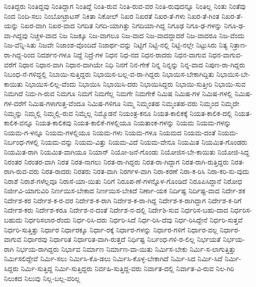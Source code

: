 {ನಿಂತಿದ್ದರು
ನಿಂತಿದ್ದವು
ನಿಂತಿದ್ದಾಗ
ನಿಂತಿದ್ದೆ
ನಿಂತಿ-ರುವ
ನಿಂತಿ-ರುವ-ವರ
ನಿಂತಿ-ರುವುದನ್ನೂ
ನಿಂತಿಲ್ಲ
ನಿಂತು
ನಿಂತೆವು
ನಿಂದ
ನಿಂದಿ-ಸಲು
ನಿಂಬೋಟ್ರಾಟಸ್
ನಿಕಿತಾ
ನಿಕೋಲ್
ನಿಖರ
ನಿಖರತೆ
ನಿಖರ-ತೆ-ಗಳು
ನಿಖರ-ತೆ-ಗಿಂತ
ನಿಖರ-ತೆ-ಯನ್ನು
ನಿಖರ-ವಾಗಿ
ನಿಖರ-ವಾದ
ನಿಗದಿತ
ನಿಗದಿ-ಯಾಗಿತ್ತು
ನಿಗದಿಯಾ-ಗಿದ್ದ
ನಿಗೂಢ
ನಿಗೂ-ಢ-ಗಳನ್ನು
ನಿಗೂ-ಢ-ವಾ-ಗಿದ್ದವು
ನಿಚ್ಚಳ-ವಾದ
ನಿಜ
ನಿಜಕ್ಕೂ
ನಿಜ-ವಾಗಲೂ
ನಿಜ-ವಾದ
ನಿಜ-ವಾದದ್ದಾದರೆ
ನಿಜ-ವಾದರೂ
ನಿಜ-ವೆಂದು
ನಿಜ-ವೆನ್ನಿ-ಸಿತು
ನಿಜವೇ
ನಿಜಾಂಶ-ವೊಂದಿದೆ
ನಿಜಾರ್ಥ-ವನ್ನು
ನಿಟ್ಟಿಗೆ
ನಿಟ್ಟಿ-ನಲ್ಲಿ
ನಿಟ್ಟಿ-ನಲ್ಲೇ
ನಿಟ್ಟುಸಿರು
ನಿತ್ಯ
ನಿತ್ರಾಣ-ರಾ-ಗಿದ್ದ-ರಿಂದ
ನಿದರ್ಶನ-ಗಳೂ
ನಿದ್ದೆ
ನಿದ್ರೆ-ಗಳ
ನಿಧನ
ನಿಧ-ನದ
ನಿಧನ-ರಾದರು
ನಿಧನ-ವಾಗುವ
ನಿಧನ-ವಾಗುವ-ವರೆಗೆ
ನಿಧಾನ
ನಿಧಾನ-ವಾಗಿ
ನಿಧಾನ-ವಾಗಿಯೇ
ನಿಧಿ
ನಿನಗೆ
ನಿನ-ಗೇಕೆ
ನಿನ್ನ
ನಿನ್ನನ್ನು
ನಿನ್ನ-ವಾದ
ನಿಪುಣ-ರಾ-ಗಿದ್ದರು
ನಿಬಂಧ-ನೆ-ಗಳಿದ್ದಲ್ಲಿ
ನಿಬಾಯಿ-ಸುತ್ತಿದ್ದರು
ನಿಭಾಯಿಸ-ಬಲ್ಲ-ವ-ರಾ-ಗಿದ್ದರು
ನಿಭಾಯಿಸ-ಬೇಕಾಗಿದ್ದಿತು
ನಿಭಾಯಿಸ-ಬೇ-ಕಾಯಿತು
ನಿಭಾಯಿಸ-ಲಿಲ್ಲ-ವೆಂದು
ನಿಭಾಯಿಸಿ
ನಿಭಾಯಿಸಿ-ದರು
ನಿಭಾಯಿಸಿದ್ದರು
ನಿಭಾಯಿ-ಸುತ್ತೀರಿ
ನಿಭಾಯಿ-ಸುವ
ನಿಮಗಿದೆ
ನಿಮ-ಗಿ-ರುವ
ನಿಮಗೂ
ನಿಮಗೆ
ನಿಮಗೆಲ್ಲ
ನಿಮಗೇ
ನಿಮಗೇಕೆ
ನಿಮಿಷ
ನಿಮಿಷ-ಗಳ
ನಿಮಿಷ-ಗಳಲ್ಲಿ
ನಿಮಿಷ-ಗಳ-ವರೆಗೆ
ನಿಮಿಷ-ಗಳಾಗುತ್ತ-ವೆಂದೂ
ನಿಮಿಷ-ಗಳಿಗೂ
ನಿಮ್ಮ
ನಿಮ್ಮಂತಹ
ನಿಮ್ಮಂತಹ-ವರು
ನಿಮ್ಮಂದ
ನಿಮ್ಮದೇ
ನಿಮ್ಮನ್ನು
ನಿಮ್ಮಲ್ಲಿ
ನಿಮ್ಮಲ್ಲಿ-ರುವ
ನಿಮ್ಮೆಲ್ಲ
ನಿಮ್ಮೊಡನೆ
ನಿಯಂತ್ರ-ಕನೂ
ನಿಯತ-ಕಾಲಿಕಕ್ಕೆ
ನಿಯತ-ಕಾಲಿಕ-ದಲ್ಲಿ
ನಿಯತ-ಕಾಲಿಕ-ವನ್ನೂ
ನಿಯತ-ಕಾಲಿಕವು
ನಿಯತ-ಕಾಲಿಕೆ-ಗಳಲ್ಲಿಯೂ
ನಿಯತಾಂಕ-ಗಳನ್ನು
ನಿಯಮ
ನಿಯಮ-ಗಳನ್ನು
ನಿಯಮ-ಗ-ಳನ್ನೂ
ನಿಯಮ-ಗಳಲ್ಲಿಯೂ
ನಿಯಮ-ಗಳು
ನಿಯಮ-ಗಳೂ
ನಿಯಮದ
ನಿಯಮ-ದಂತೆ
ನಿಯಮ-ನಿರ್ಬಂಧ-ಗಳಲ್ಲಿ
ನಿಯಮ-ವನ್ನು
ನಿಯಮ-ವಿತ್ತು
ನಿಯಮ-ವಿದೆ
ನಿಯಮ-ವೇನೂ
ನಿಯಮಿತ
ನಿಯಮಿತ-ಗೊಂಡರು
ನಿಯಮಿತ-ರಾಗಿ
ನಿಯಮಿತ-ವಾಗಿಯೂ
ನಿಯಾನ್
ನಿಯೋ-ಜನೆ-ಗೊಂಡು
ನಿಯೋಜಿಸ-ಬೇ-ಕಾಯಿತು
ನಿಯೋಜಿ-ಸಿದ್ದ
ನಿರಂತರ
ನಿರಂತರ-ವಾಗಿ
ನಿರತ
ನಿರತ-ನಾಗಲು
ನಿರತ-ರಾ-ಗಿದ್ದರು
ನಿರತ-ರಾ-ಗಿದ್ದಾಗ
ನಿರತ-ರಾಗಿ-ರುತ್ತಿದ್ದರು
ನಿರತ-ರಾಗಿ-ರುವ-ವರು
ನಿರತ-ರಾದರು
ನಿರತರು
ನಿರತ-ವಾಗಿ
ನಿರರ್ಗಳ-ವಾಗಿ
ನಿರಾ-ಕರಣೆ
ನಿರಾ-ಕ-ರಿಸಿ
ನಿರಾ-ಕರಿ-ಸು-ವುದು
ನಿರಾಶೆ
ನಿರಾಶೆ-ಗಳೆಲ್ಲವೂ
ನಿರಾಸೆ-ಯಾ-ಯಿತು
ನಿರಿಗೆ
ನಿರೂಪ-ಣೆ-ಗಳನ್ನೊಳ-ಗೊಂಡಿದೆ
ನಿರೂಪಿಸಿದ್ದಾನೆ
ನಿರೋಧ
ನಿರ್ಜೀವಿ-ಯಾಗುವಿರಿ
ನಿರ್ಣಯಿಸ-ಬೇಕಾದ
ನಿರ್ಣಯಿಸ-ಬೇಕಿದೆ
ನಿರ್ಣಾ-ಯಕ
ನಿರ್ದಿಷ್ಟ
ನಿರ್ದಿಷ್ಟ-ವಾದ
ನಿರ್ದೇ-ಶಕ
ನಿರ್ದೇಶ-ಕರ
ನಿರ್ದೇಶ-ಕ-ರ-ವರ
ನಿರ್ದೇಶ-ಕ-ರಾಗಿ
ನಿರ್ದೇಶ-ಕ-ರಾ-ಗಿದ್ದ
ನಿರ್ದೇಶ-ಕ-ರಾಗಿದ್ದಾಗ
ನಿರ್ದೇಶ-ಕ-ರಿಗೆ
ನಿರ್ದೇಶ-ಕರು
ನಿರ್ದೇಶ-ಕರೂ
ನಿರ್ದೇಶ-ನ-ದಂತೆ
ನಿರ್ದೇಶ-ನ-ದಲ್ಲಿ
ನಿರ್ದೇಶಿ-ಸುವ
ನಿರ್ಧರಿಸ-ಬಹು-ದಾದ
ನಿರ್ಧರಿಸ-ಬಹುದು
ನಿರ್ಧರಿಸಲಾರ-ರೆಂದು
ನಿರ್ಧ-ರಿಸಿ-ದರು
ನಿರ್ಧರಿ-ಸಿದೆ
ನಿರ್ಧ-ರಿಸಿ-ದೆವು
ನಿರ್ಧ-ರಿಸಿದ್ದೇನೆ
ನಿರ್ಧರಿ-ಸುತ್ತವೆ
ನಿರ್ಧರಿ-ಸುತ್ತಿತ್ತು
ನಿರ್ಧಾರ
ನಿರ್ಧಾರಕ್ಕೂ
ನಿರ್ಧಾ-ರಕ್ಕೆ
ನಿರ್ಧಾರ-ಗಳನ್ನು
ನಿರ್ಧಾರ-ಗಳಿಗೆ
ನಿರ್ಧಾರ-ವಲ್ಲ
ನಿರ್ಧಾರ-ವಾಗುವ
ನಿರ್ಧಾರವು
ನಿರ್ಧಾರಿತ
ನಿರ್ಧಾರಿತ-ವಾಗಿ-ರುತ್ತದೆ
ನಿರ್ಧಿಷ್ಟ
ನಿರ್ಬಂಧ-ಗಳಿ-ರ-ಲಿಲ್ಲ
ನಿರ್ಭಯತೆ
ನಿರ್ಭಯ-ರಾಗಿ
ನಿರ್ಭಯ-ರಾಗಿದ್ದರು
ನಿರ್ಭಾವ
ನಿರ್ಮಾಣ
ನಿರ್ಮಾಣ-ವಾ-ಯಿತು
ನಿರ್ಮಿಸ-ಬೇಕು
ನಿರ್ಮಿ-ಸ-ಲಾಗುತ್ತಿತ್ತು
ನಿರ್ಮಿಸಲಿದ್ದೇವೆ
ನಿರ್ಮಿ-ಸಲು
ನಿರ್ಮಿಸಿ-ಕೊ-ಡಲು
ನಿರ್ಮಿಸಿ-ಕೊಳ್ಳ-ಬೇಕಾಗಿದೆ
ನಿರ್ಮಿ-ಸಿದ
ನಿರ್ಮಿ-ಸಿದೆ
ನಿರ್ಮಿ-ಸಿದ್ದರು
ನಿರ್ಮಿ-ಸುತ್ತಿದ್ದ
ನಿರ್ಮಿ-ಸುತ್ತಿದ್ದರು
ನಿರ್ವಹಿ-ಸುತ್ತಿದ್ದ-ವರು
ನಿರ್ವಾತ-ದಲ್ಲಿ
ನಿರ್ವಾತ-ವಿ-ರುವ
ನಿಲ-ಗಿರಿ
ನಿಲುಕದ
ನಿಲುವು
ನಿಲ್ಲ-ಬಲ್ಲ-ವರಿಲ್ಲ
}
